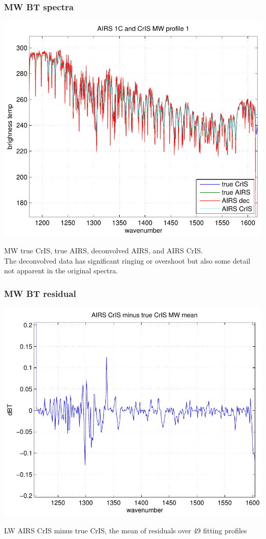 \documentclass[11pt]{beamer}
\begin{document}
\begin{frame}
\frametitle{MW BT spectra}

\begin{center}
  \includegraphics[scale=0.54]{figures/fig_1_MW.pdf}
\end{center}

MW true CrIS, true AIRS, deconvolved AIRS, and AIRS CrIS.  \\
The deconvolved data has significant ringing or overshoot but also
some detail not apparent in the original spectra.

\end{frame}
\begin{frame}
\frametitle{MW BT residual}

\begin{center}
  \includegraphics[scale=0.54]{figures/fig_2_MW.pdf}
\end{center}

LW AIRS CrIS minus true CrIS, the mean of residuals over 49 fitting
profiles

\end{frame}
\end{document}
